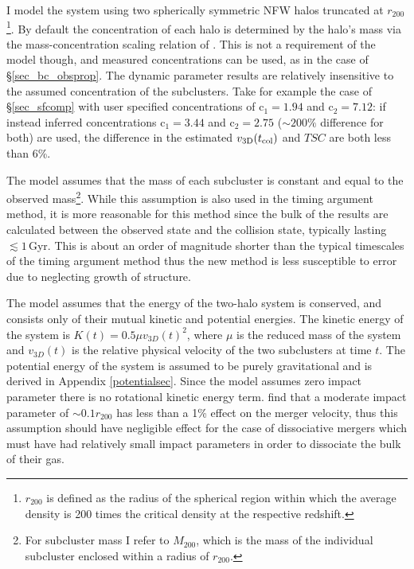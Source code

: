 I model the system using two spherically symmetric NFW halos truncated at $r_{200}$\footnote{$r_{200}$ is defined as the radius of the spherical region within which the average density is 200 times the critical density at the respective redshift.}.  
By default the concentration of each halo is determined by the halo's mass via the mass-concentration scaling relation of \citet{Duffy:2008jy}.
This is not a requirement of the model though, and measured concentrations can be used, as in the case of \S\ref{sec_bc_obsprop}. 
The dynamic parameter results are relatively insensitive to the assumed concentration of the subclusters.  
Take for example the case of \S\ref{sec_sfcomp} with user specified concentrations of c$_1=1.94$ and c$_2=7.12$: if instead \citet{Duffy:2008jy} inferred concentrations c$_1=3.44$ and c$_2=2.75$ ($\sim200\%$ difference for both) are used, the difference in the estimated $v_{\rm 3D}(t_{\rm col})$ and $TSC$ are both less than 6\%.

The model assumes that the mass of each subcluster is constant and equal to the observed mass\footnote{For subcluster mass I refer to $M_{200}$, which is the mass of the individual subcluster enclosed within a radius of $r_{200}$.}.  
While this assumption is also used in the timing argument method, it is more reasonable for this method since the bulk of the results are calculated between the observed state and the collision state, typically lasting $\lesssim 1$\,Gyr.
This is about an order of magnitude shorter than the typical timescales of the timing argument method thus the new method is less susceptible to error due to neglecting growth of structure.

The model assumes that the energy of the two-halo system is conserved, and consists only of their mutual kinetic and potential energies.  
The kinetic energy of the system is $K(t) =  0.5 \mu v_{3D}(t)^2$, where $\mu$ is the reduced mass of the system and $v_{3D}(t)$ is the relative physical velocity of the two subclusters at time $t$.
The potential energy of the system is assumed to be purely gravitational and is derived in Appendix \ref{potentialsec}.
Since the model assumes zero impact parameter there is no rotational kinetic energy term.
\citet{Mastropietro:2008fs} find that a moderate impact parameter of $\sim0.1 r_{200}$ has less than a 1\% effect on the merger velocity, thus this assumption should have negligible effect for the case of dissociative mergers which must have had relatively small impact parameters in order to dissociate the bulk of their gas.

